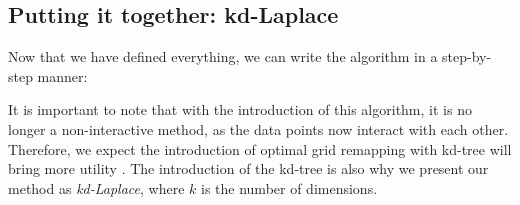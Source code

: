 
\newpage
\subsection{Putting it together: kd-Laplace}
Now that we have defined everything, we can write the algorithm in a step-by-step manner:


It is important to note that with the introduction of this algorithm, it is no longer a non-interactive method, as the data points now interact with each other.
Therefore, we expect the introduction of optimal grid remapping with kd-tree will bring more utility \citep{wang_comprehensive_2020, xiongComprehensiveSurveyLocal2020}.
The introduction of the kd-tree is also why we present our method as \textit{kd-Laplace}, where $k$ is the number of dimensions.


\newpage


